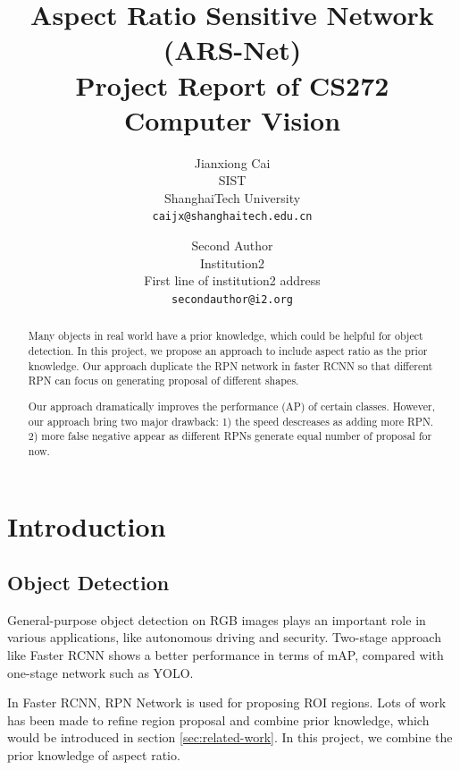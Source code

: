 \documentclass[10pt,twocolumn,letterpaper]{article}
\begin{document}
\title{Aspect Ratio Sensitive Network (ARS-Net) \\ 
\small Project Report of CS272 Computer Vision
}

\author{Jianxiong Cai\\
SIST \\
ShanghaiTech University\\
{\tt\small caijx@shanghaitech.edu.cn}
\and
Second Author\\
Institution2\\
First line of institution2 address\\
{\tt\small secondauthor@i2.org}
}

\maketitle

\begin{abstract}
\par
Many objects in real world have a prior knowledge, which could be helpful for object detection. In this project, we propose an approach to include aspect ratio as the prior knowledge. Our approach duplicate the RPN network in faster RCNN \cite{fasterRCNN} so that different RPN can focus on generating proposal of different shapes.
\par
Our approach dramatically improves the performance (AP) of certain classes. However, our approach bring two major drawback: 1) the speed descreases as adding more RPN. 2) more false negative appear as different RPNs generate equal number of proposal for now.

\end{abstract}

\section{Introduction}
\par
\subsection{Object Detection}
\par
General-purpose object detection on RGB images plays an important role in various applications, like autonomous driving and security. Two-stage approach like Faster RCNN \cite{fasterRCNN} shows a better performance in terms of mAP, compared with one-stage network such as YOLO.
\par
In Faster RCNN, RPN Network is used for proposing ROI regions. Lots of work has been made to refine region proposal and combine prior knowledge, which would be introduced in section \ref{sec:related-work}. In this project, we combine the prior knowledge of aspect ratio.
\end{document}
